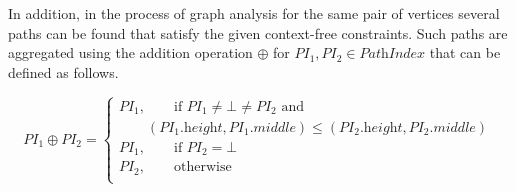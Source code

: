 In addition, in the process of graph analysis for the same pair of vertices several paths can be found that satisfy the given context-free constraints. Such paths are aggregated using the addition operation $\oplus$ for \mbox{$\textit{PI}_1, \textit{PI}_2 \in \textit{PathIndex}$} that can be defined as follows.

$$\textit{PI}_1 \oplus \textit{PI}_2 = \begin{cases}
      \textit{PI}_1, \qquad \text{if $\textit{PI}_1\neq \bot \neq \textit{PI}_2$ and} \\ \qquad (\textit{PI}_1.\textit{height}, \textit{PI}_1.\textit{middle}) \leq (\textit{PI}_2.\textit{height}, \textit{PI}_2.\textit{middle}) \\
      \textit{PI}_1, \qquad \text{if $\textit{PI}_2 = \bot$} \\
      \textit{PI}_2, \qquad \text{otherwise} \\
    \end{cases}\
$$

